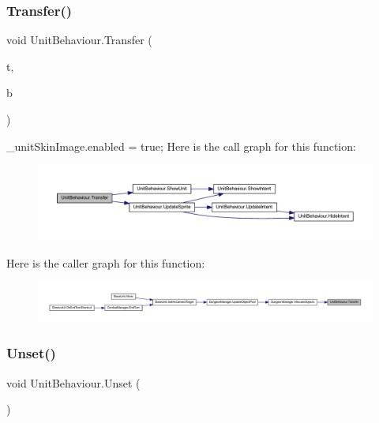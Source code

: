 \subsubsection{\texorpdfstring{Transfer()}{Transfer()}}
{\footnotesize\ttfamily void Unit\+Behaviour.\+Transfer (\begin{DoxyParamCaption}\item[{\mbox{\hyperlink{class_tile}{Tile}}}]{t,  }\item[{\mbox{\hyperlink{class_base_unit}{Base\+Unit}}}]{b }\end{DoxyParamCaption})}

\+\_\+unit\+Skin\+Image.\+enabled = true; Here is the call graph for this function\+:
\nopagebreak
\begin{figure}[H]
\begin{center}
\leavevmode
\includegraphics[width=350pt]{class_unit_behaviour_a7e978454f207985987f6088c037b9c5f_cgraph}
\end{center}
\end{figure}
Here is the caller graph for this function\+:
\nopagebreak
\begin{figure}[H]
\begin{center}
\leavevmode
\includegraphics[width=350pt]{class_unit_behaviour_a7e978454f207985987f6088c037b9c5f_icgraph}
\end{center}
\end{figure}
\mbox{\label{class_unit_behaviour_adf2d07785a2cc3076363ad5dd0962b9c}} 
\subsubsection{\texorpdfstring{Unset()}{Unset()}}
{\footnotesize\ttfamily void Unit\+Behaviour.\+Unset (\begin{DoxyParamCaption}{ }\end{DoxyParamCaption})}

